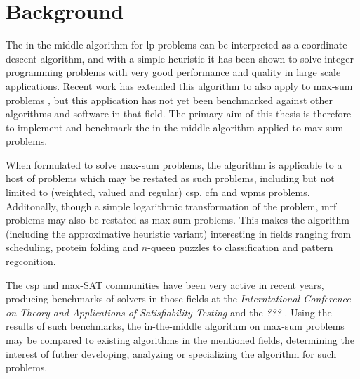 \section{Background}
The in-the-middle algorithm \parencite{Wedelin95} for \acrlong{lp} problems can be interpreted as a coordinate descent algorithm, and with a simple heuristic it has been shown to solve integer programming problems with very good performance and quality in large scale applications.
Recent work has extended this algorithm to also apply to max-sum problems \parencite{Wedelin13}, but this application has not yet been benchmarked against other algorithms and software in that field.
The primary aim of this thesis is therefore to implement and benchmark the in-the-middle algorithm applied to max-sum problems.

When formulated to solve max-sum problems, the algorithm is applicable to a host of problems which may be restated as such problems, including but not limited to (weighted, valued and regular) \gls{csp}, \gls{cfn} and \gls{wpms} problems.
Additonally, though a simple logarithmic transformation of the problem, \gls{mrf} problems may also be restated as max-sum problems.
This makes the algorithm (including the approximative heuristic variant) interesting in fields ranging from scheduling, protein folding and \(n\)-queen puzzles to classification and pattern regconition.

The \gls{csp} and max-SAT communities have been very active in recent years, producing benchmarks of solvers in those fields at the \emph{Interntational Conference on Theory and Applications of Satisfiability Testing} \parencite{Argelich11} and the \emph{???} \parencites{Allouche14b}{deGivry14}.
Using the results of such benchmarks, the in-the-middle algorithm on max-sum problems may be compared to existing algorithms in the mentioned fields, determining the interest of futher developing, analyzing or specializing the algorithm for such problems.
